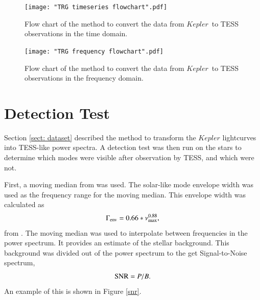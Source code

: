 \documentclass[a4paper,fleqn,usenatbib,useAMS]{mnras}
\newcommand{\numax}{\ensuremath{\nu_{\textrm{max}}}}
\newcommand{\kep}{\ensuremath{Kepler}\:}
\begin{document}
\onecolumn
\begin{figure}
	\centering
	\texttt{[image: "TRG timeseries flowchart".pdf]}
	\caption{Flow chart of the method to convert the data from \kep \ to TESS observations in the time domain.}	
	\label{ts flowchart}
\end{figure} 

\begin{figure}
	\centering
	\texttt{[image: "TRG frequency flowchart".pdf]}
	\caption{Flow chart of the method to convert the data from \kep \ to TESS observations in the frequency domain.}	
	\label{fr flowchart}
\end{figure}
\newpage
\twocolumn


\section{Detection Test}
\label{sect: det_test}

Section \ref{sect: dataset} described the method to transform the $Kepler$ lightcurves into TESS-like power spectra. A detection test was then run on the stars to determine which modes were visible after observation by TESS, and which were not.

First, a moving median from \citet{davies_asteroseismology_2016} was used. The solar-like mode envelope width was used as the frequency range for the moving median. This envelope width was calculated as
\begin{equation}
\Gamma_{\rm env} = 0.66 * \numax^{0.88},
\end{equation}
from \citet{mosser_characterization_2012}. The moving median was used to interpolate between frequencies in the power spectrum. It provides an estimate of the stellar background. This background was divided out of the power spectrum to the get Signal-to-Noise spectrum,
\begin{equation}
\label{eq:snr}
{\rm SNR} = P/B.
\end{equation}
An example of this is shown in Figure \ref{snr}.
\end{document}
